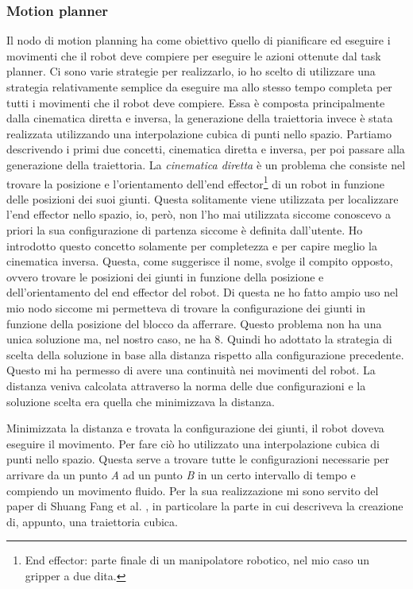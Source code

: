 \subsubsection{Motion planner}
\label{subsubsec:motionplanner}
Il nodo di motion planning ha come obiettivo quello di pianificare ed eseguire i movimenti che il robot deve compiere per eseguire le azioni ottenute dal task planner.
Ci sono varie strategie per realizzarlo, io ho scelto di utilizzare una strategia relativamente semplice da eseguire ma allo stesso tempo completa per tutti i movimenti che il robot deve compiere. Essa è composta principalmente dalla cinematica diretta e inversa, la generazione della traiettoria invece è stata realizzata utilizzando una interpolazione cubica di punti nello spazio.
Partiamo descrivendo i primi due concetti, cinematica diretta e inversa, per poi passare alla generazione della traiettoria.
La \textit{cinematica diretta} è un problema che consiste nel trovare la posizione e l'orientamento dell'end effector\footnote{End effector: parte finale di un manipolatore robotico, nel mio caso un gripper a due dita.} di un robot in funzione delle posizioni dei suoi giunti. 
Questa solitamente viene utilizzata per localizzare l'end effector nello spazio, io, però, non l'ho mai utilizzata siccome conoscevo a priori la sua configurazione di partenza siccome è definita dall'utente. Ho introdotto questo concetto solamente per completezza e per capire meglio la cinematica inversa.
Questa, come suggerisce il nome, svolge il compito opposto, ovvero trovare le posizioni dei giunti in funzione della posizione e dell'orientamento del end effector del robot.
Di questa ne ho fatto ampio uso nel mio nodo siccome mi permetteva di trovare la configurazione dei giunti in funzione della posizione del blocco da afferrare.
Questo problema non ha una unica soluzione ma, nel nostro caso, ne ha 8. Quindi ho adottato la strategia di scelta della soluzione in base alla distanza rispetto alla configurazione precedente. Questo mi ha permesso di avere una continuità nei movimenti del robot.
La distanza veniva calcolata attraverso la norma delle due configurazioni e la soluzione scelta era quella che minimizzava la distanza.

Minimizzata la distanza e trovata la configurazione dei giunti, il robot doveva eseguire il movimento. Per fare ciò ho utilizzato una interpolazione cubica di punti nello spazio. Questa serve a trovare tutte le configurazioni necessarie per arrivare da un punto \textit{A} ad un punto \textit{B} in un certo intervallo di tempo e compiendo un movimento fluido. 
Per la sua realizzazione mi sono servito del paper di Shuang Fang et al. \cite{8941347}, in particolare la parte in cui descriveva la creazione di, appunto, una traiettoria cubica.

